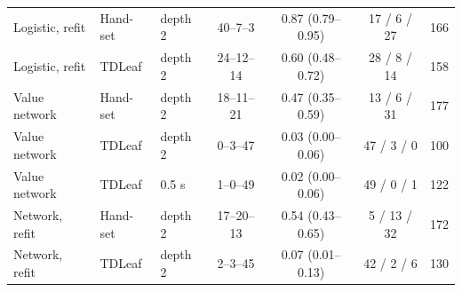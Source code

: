 \begin{table}[!htbp]
\begin{tabular}{@{}lllcccr@{}}
Logistic, refit & Hand-set & depth 2 & 40--7--3 & 0.87 (0.79--0.95) & 17 / 6 / 27 & 166 \\
Logistic, refit & TDLeaf & depth 2 & 24--12--14 & 0.60 (0.48--0.72) & 28 / 8 / 14 & 158 \\
Value network & Hand-set & depth 2 & 18--11--21 & 0.47 (0.35--0.59) & 13 / 6 / 31 & 177 \\
Value network & TDLeaf & depth 2 & 0--3--47 & 0.03 (0.00--0.06) & 47 / 3 / 0 & 100 \\
Value network & TDLeaf & 0.5 s & 1--0--49 & 0.02 (0.00--0.06) & 49 / 0 / 1 & 122 \\
Network, refit & Hand-set & depth 2 & 17--20--13 & 0.54 (0.43--0.65) & 5 / 13 / 32 & 172 \\
Network, refit & TDLeaf & depth 2 & 2--3--45 & 0.07 (0.01--0.13) & 42 / 2 / 6 & 130 \\
\bottomrule
\end{tabular}
\par{}
\end{table}
